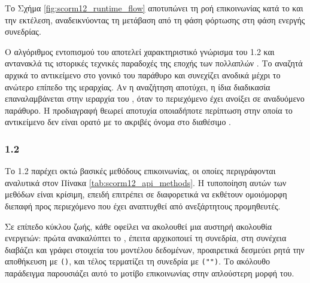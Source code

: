 Το Σχήμα \ref{fig:scorm12_runtime_flow} αποτυπώνει τη ροή επικοινωνίας κατά το  και την εκτέλεση, αναδεικνύοντας τη μετάβαση από τη φάση φόρτωσης στη φάση ενεργής συνεδρίας.



Ο αλγόριθμος εντοπισμού του  αποτελεί χαρακτηριστικό γνώρισμα του  1.2 και αντανακλά τις ιστορικές τεχνικές παραδοχές της εποχής των πολλαπλών . Το  αναζητά αρχικά το αντικείμενο \texttt{} στο γονικό του παράθυρο και συνεχίζει ανοδικά μέχρι το ανώτερο επίπεδο της ιεραρχίας. Αν η αναζήτηση αποτύχει, η ίδια διαδικασία επαναλαμβάνεται στην ιεραρχία του , όταν το περιεχόμενο έχει ανοίξει σε αναδυόμενο παράθυρο. Η προδιαγραφή θεωρεί αποτυχία οποιαδήποτε περίπτωση στην οποία το αντικείμενο δεν είναι ορατό με το ακριβές όνομα \texttt{} στο διαθέσιμο .

\subsubsection{ 1.2  }

Το  1.2  παρέχει οκτώ βασικές μεθόδους επικοινωνίας, οι οποίες περιγράφονται αναλυτικά στον Πίνακα \ref{tab:scorm12_api_methods}. Η τυποποίηση αυτών των μεθόδων είναι κρίσιμη, επειδή επιτρέπει σε διαφορετικά  να εκθέτουν ομοιόμορφη διεπαφή προς περιεχόμενο που έχει αναπτυχθεί από ανεξάρτητους προμηθευτές.



Σε επίπεδο κύκλου ζωής, κάθε  οφείλει να ακολουθεί μια αυστηρή ακολουθία ενεργειών: πρώτα ανακαλύπτει το , έπειτα αρχικοποιεί τη συνεδρία, στη συνέχεια διαβάζει και γράφει στοιχεία του μοντέλου δεδομένων, προαιρετικά δεσμεύει ρητά την αποθήκευση με \texttt{()}, και τέλος τερματίζει τη συνεδρία με \texttt{("")}. Το ακόλουθο παράδειγμα παρουσιάζει αυτό το μοτίβο επικοινωνίας στην απλούστερη μορφή του.

